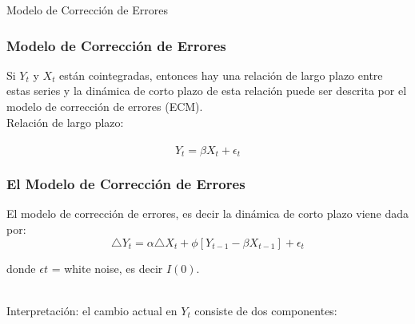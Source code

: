 \documentclass[spanish,xcolor=table]{beamer}
\begin{document}
\begin{section}{Modelo de Correcci\'on de Errores}
\begin{frame}
\frametitle{Modelo de Correcci\'on de Errores}

Si $Y_t$ y $X_t$ est\'an cointegradas, entonces hay una relaci\'on de largo plazo entre estas series y la din\'amica de corto plazo de esta relaci\'on puede ser descrita por el modelo de correcci\'on de errores (ECM).\\

\vspace{4mm}	
Relación de largo plazo:\\
 
\begin{equation}
Y_t = \beta X_t  + \epsilon_t 
\end{equation}

\end{frame}
\begin{frame}
\frametitle{El Modelo de Correcci\'on de Errores}

El modelo de correcci\'on de errores, es decir la din\'amica de corto plazo viene dada por:\\

\begin{equation}
\triangle Y_t = \alpha \triangle X_t + \phi [Y_{t-1} - \beta X_{t-1} ] + \epsilon_t 
\end{equation}

donde $\epsilon t$ = white noise, es decir $I(0)$.\\
 \vspace{4mm}	

Interpretaci\'on: el cambio actual en $Y_t$ consiste de dos componentes:\\


\end{frame}


\end{section}
\end{document}
